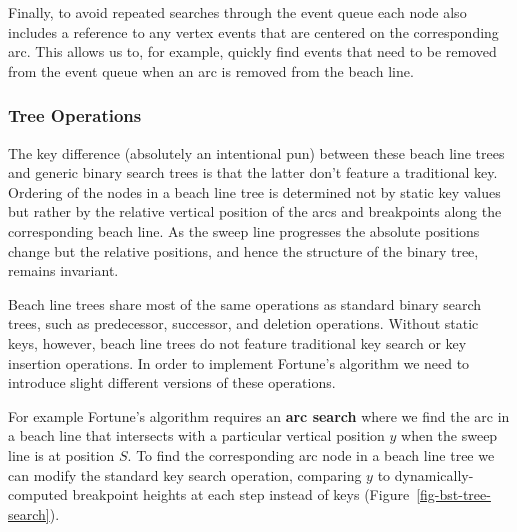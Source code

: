 \documentclass[
  letterpaper,
  DIV=11,
  numbers=noendperiod]{scrartcl}
\begin{document}
Finally, to avoid repeated searches through the event queue each node
also includes a reference to any vertex events that are centered on the
corresponding arc. This allows us to, for example, quickly find events
that need to be removed from the event queue when an arc is removed from
the beach line.

\subsubsection{Tree Operations}\label{tree-operations}

The key difference (absolutely an intentional pun) between these beach
line trees and generic binary search trees is that the latter don't
feature a traditional key. Ordering of the nodes in a beach line tree is
determined not by static key values but rather by the relative vertical
position of the arcs and breakpoints along the corresponding beach line.
As the sweep line progresses the absolute positions change but the
relative positions, and hence the structure of the binary tree, remains
invariant.

Beach line trees share most of the same operations as standard binary
search trees, such as predecessor, successor, and deletion operations.
Without static keys, however, beach line trees do not feature
traditional key search or key insertion operations. In order to
implement Fortune's algorithm we need to introduce slight different
versions of these operations.

For example Fortune's algorithm requires an \textbf{arc search} where we
find the arc in a beach line that intersects with a particular vertical
position \(y\) when the sweep line is at position \(S\). To find the
corresponding arc node in a beach line tree we can modify the standard
key search operation, comparing \(y\) to dynamically-computed breakpoint
heights at each step instead of keys (Figure~\ref{fig-bst-tree-search}).
\end{document}
